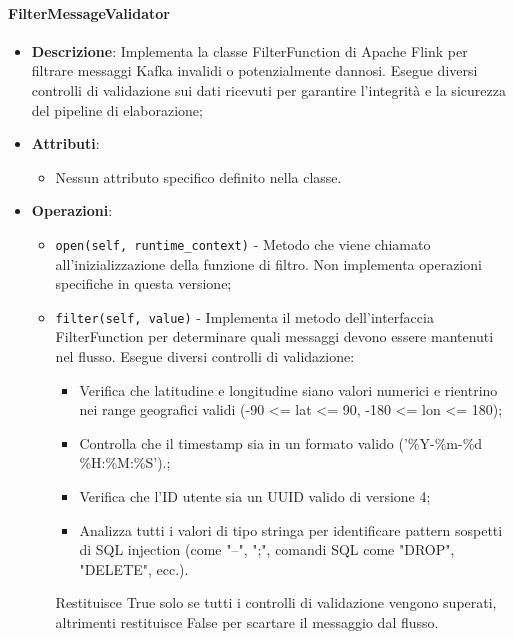 \documentclass[10pt]{article}
\begin{document}
    \paragraph{FilterMessageValidator}
    \begin{itemize} 
    \item \textbf{Descrizione}: Implementa la classe FilterFunction di Apache Flink per filtrare messaggi Kafka invalidi o potenzialmente dannosi. Esegue diversi controlli di validazione sui dati ricevuti per garantire l'integrità e la sicurezza del pipeline di elaborazione;
    \item \textbf{Attributi}:
    \begin{itemize}
        \item Nessun attributo specifico definito nella classe.
    \end{itemize}
    
    \item \textbf{Operazioni}:
    \begin{itemize}
        \item \texttt{open(self, runtime\_context)} - Metodo che viene chiamato all'inizializzazione della funzione di filtro. Non implementa operazioni specifiche in questa versione;
        
        \item \texttt{filter(self, value)} - Implementa il metodo dell'interfaccia FilterFunction per determinare quali messaggi devono essere mantenuti nel flusso. Esegue diversi controlli di validazione:
        \begin{itemize}
            \item Verifica che latitudine e longitudine siano valori numerici e rientrino nei range geografici validi (-90 <= lat <= 90, -180 <= lon <= 180);
            \item Controlla che il timestamp sia in un formato valido ('\%Y-\%m-\%d \%H:\%M:\%S').;
            \item Verifica che l'ID utente sia un UUID valido di versione 4;
            \item Analizza tutti i valori di tipo stringa per identificare pattern sospetti di SQL injection (come "--", ";", comandi SQL come "DROP", "DELETE", ecc.).
        \end{itemize}
        Restituisce True solo se tutti i controlli di validazione vengono superati, altrimenti restituisce False per scartare il messaggio dal flusso.
    \end{itemize}
    \end{itemize}
\end{document}
